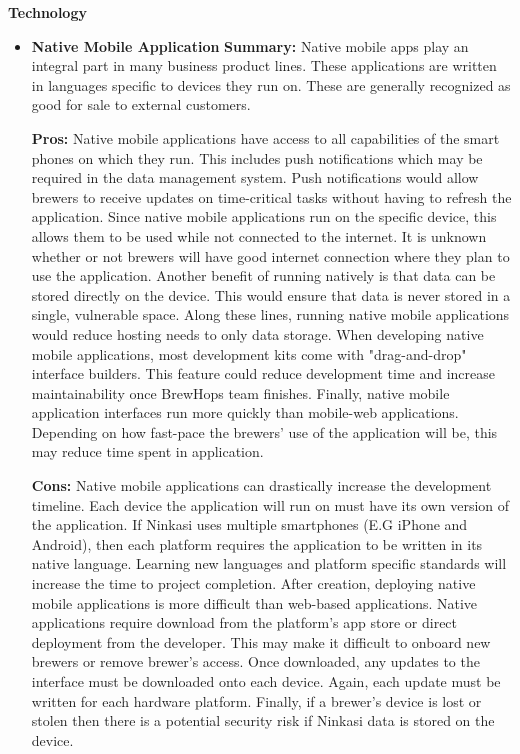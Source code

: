 \documentclass[draftclsnofoot,onecolumn,letterpaper,10pt]{IEEEtran}
\begin{document}
		\textbf{Technology}
			\begin{itemize}

				\item{\textbf{Native Mobile Application}}
					\textbf{Summary:}
							Native mobile apps play an integral part in many business product lines.
							These applications are written in languages specific to devices they run on.
							These are generally recognized as good for sale to external customers\cite{SearchCloudOverview}.

					\textbf{Pros:}
							Native mobile applications have access to all capabilities of the smart phones on which they run.
							This includes push notifications which may be required in the data management system.
							Push notifications would allow brewers to receive updates on time-critical tasks without having to refresh the application.
							Since native mobile applications run on the specific device, this allows them to be used while not connected to the internet.
							It is unknown whether or not brewers will have good internet connection where they plan to use the application.
							Another benefit of running natively is that data can be stored directly on the device.
							This would ensure that data is never stored in a single, vulnerable space.
							Along these lines, running native mobile applications would reduce hosting needs to only data storage.
							When developing native mobile applications, most development kits come with "drag-and-drop" interface builders.
							This feature could reduce development time and increase maintainability once BrewHops team finishes.
							Finally, native mobile application interfaces run more quickly than mobile-web applications.
							Depending on how fast-pace the brewers' use of the application will be, this may reduce time spent in application.

					\textbf{Cons:}
							Native mobile applications can drastically increase the development timeline.
							Each device the application will run on must have its own version of the application.
							If Ninkasi uses multiple smartphones (E.G iPhone and Android), then each platform requires the application to be written in its native language.
							Learning new languages and platform specific standards will increase the time to project completion.
							After creation, deploying native mobile applications is more difficult than web-based applications.
							Native applications require download from the platform's app store or direct deployment from the developer.
							This may make it difficult to onboard new brewers or remove brewer's access.
							Once downloaded, any updates to the interface must be downloaded onto each device.
							Again, each update must be written for each hardware platform.
							Finally, if a brewer's device is lost or stolen then there is a potential security risk if Ninkasi data is stored on the device.



\end{itemize}
\end{document}
